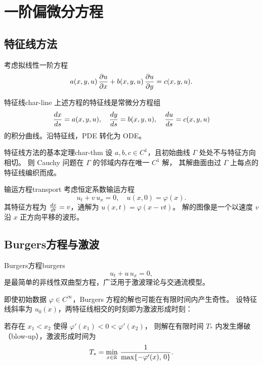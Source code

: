 \documentclass[11pt,a4paper,openany,oneside]{ctexbook}
\begin{document}
\newpage

\chapter{一阶偏微分方程}

\section{特征线方法}

考虑拟线性一阶方程
$$
a(x,y,u)\,\frac{\partial u}{\partial x} + b(x,y,u)\,\frac{\partial u}{\partial y} = c(x,y,u).
$$

\begin{definition}{特征线}{char-line}
  上述方程的特征线是常微分方程组
  $$
  \frac{d x}{d s}=a(x,y,u),\quad \frac{d y}{d s}=b(x,y,u),\quad \frac{d u}{d s}=c(x,y,u)
  $$
  的积分曲线。沿特征线，PDE 转化为 ODE。
\end{definition}

\begin{theorem}{特征线方法的基本定理}{char-thm}
  设 $a,b,c\in C^{1}$，且初始曲线 $\Gamma$ 处处不与特征方向相切。
  则 Cauchy 问题在 $\Gamma$ 的邻域内存在唯一 $C^{1}$ 解，
  其解曲面由过 $\Gamma$ 上每点的特征线编织而成。
\end{theorem}

\begin{example}{输运方程}{transport}
  考虑恒定系数输运方程
  $$
  u_{t} + v\,u_{x} = 0,\quad u(x,0)=\varphi(x).
  $$
  其特征方程为 $\frac{d x}{d t}=v$，通解为 $u(x,t)=\varphi(x-vt)$。
  解的图像是一个以速度 $v$ 沿 $x$ 正方向平移的波形。
\end{example}

\section{Burgers方程与激波}

\begin{definition}{Burgers方程}{burgers}
  $$
  u_{t} + u\,u_{x} = 0,
  $$
  是最简单的非线性双曲型方程，广泛用于激波理论与交通流模型。
\end{definition}

即使初始数据 $\varphi\in C^{\infty}$，Burgers 方程的解也可能在有限时间内产生奇性。
设特征线斜率为 $u_{0}(x)$，两特征线相交的时刻即为激波形成时刻：

\begin{keyeq}[激波形成条件]
  若存在 $x_{1}<x_{2}$ 使得 $\varphi'(x_{1})<0<\varphi'(x_{2})$，
  则解在有限时间 $T_{*}$ 内发生爆破（blow-up），激波形成时间为
  $$
  T_{*} = \min_{x\in\mathbb{R}}\,\frac{1}{\max\{-\varphi'(x),\,0\}}.
  $$
\end{keyeq}
\end{document}
